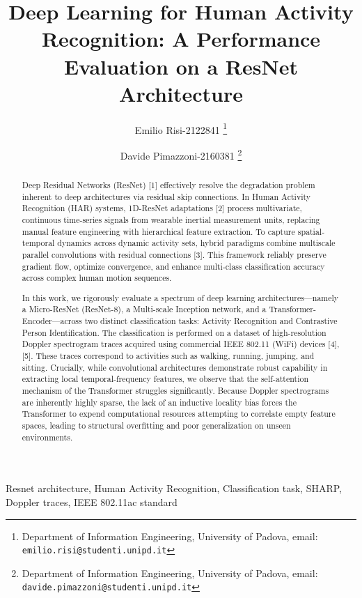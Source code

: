 \documentclass[10pt, conference, letterpaper]{IEEEtran}
\title{Deep Learning for Human Activity Recognition: A Performance Evaluation on a ResNet Architecture}
\author{Emilio Risi-2122841
\thanks{Department of Information Engineering, University of Padova, email: \texttt{emilio.risi@studenti.unipd.it}}
\and
Davide Pimazzoni-2160381
\thanks{Department of Information Engineering, University of Padova, email: \texttt{davide.pimazzoni@studenti.unipd.it}}
}
\begin{document}
\maketitle

\begin{abstract}
Deep Residual Networks (ResNet) [1] effectively resolve the degradation problem inherent to deep architectures via residual skip connections. In Human Activity Recognition (HAR) systems, 1D-ResNet adaptations [2] process multivariate, continuous time-series signals from wearable inertial measurement units, replacing manual feature engineering with hierarchical feature extraction. To capture spatial-temporal dynamics across dynamic activity sets, hybrid paradigms combine multiscale parallel convolutions with residual connections [3]. This framework reliably preserve gradient flow, optimize convergence, and enhance multi-class classification accuracy across complex human motion sequences.

In this work, we rigorously evaluate a spectrum of deep learning architectures---namely a Micro-ResNet (ResNet-8), a Multi-scale Inception network, and a Transformer-Encoder---across two distinct classification tasks: Activity Recognition and Contrastive Person Identification. The classification is performed on a dataset of high-resolution Doppler spectrogram traces acquired using commercial IEEE 802.11 (WiFi) devices [4], [5]. These traces correspond to activities such as walking, running, jumping, and sitting. Crucially, while convolutional architectures demonstrate robust capability in extracting local temporal-frequency features, we observe that the self-attention mechanism of the Transformer struggles significantly. Because Doppler spectrograms are inherently highly sparse, the lack of an inductive locality bias forces the Transformer to expend computational resources attempting to correlate empty feature spaces, leading to structural overfitting and poor generalization on unseen environments.
\end{abstract}

\begin{IEEEkeywords}
Resnet architecture, Human Activity Recognition, Classification task, SHARP, Doppler traces, IEEE 802.11ac standard
\end{IEEEkeywords}








\nocite{*}


\end{document}

